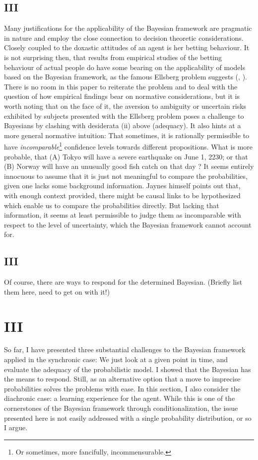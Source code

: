 \documentclass[11pt, a4paper]{scrartcl}
\begin{document}
\subsection{III}
Many justifications for the applicability of the Bayesian framework are pragmatic in nature and employ the close connection to decision theoretic considerations. Closely coupled to the doxastic attitudes of an agent is her betting behaviour. It is not surprising then, that results from empirical studies of the betting behaviour of actual people do have some bearing on the applicability of models based on the Bayesian framework, as the famous Ellsberg problem suggests (\cite{10.2307/1884324}, \cite{Camerer1992}). There is no room in this paper to reiterate the problem and to deal with the question of how empirical findings bear on normative considerations, but it is worth noting that on the face of it, the aversion to ambiguity or uncertain risks exhibited by subjects presented with the Ellsberg problem poses a challenge to Bayesians by clashing with desiderata (ii) above (adequacy). It also hints at a more general normative intuition: That sometimes, it is rationally permissible to have \emph{incomparable}\footnote{Or sometimes, more fancifully, incommensurable.} confidence levels towards different propositions. What is more probable, that (A) Tokyo will have a severe earthquake on June 1, 2230; or that (B) Norway will have an unusually good fish catch on that day \citep[p.658]{Jaynes2003-JAYPTT}? It seems entirely innocuous to assume that it is just not meaningful to compare the probabilities, given one lacks some background information. Jaynes himself points out that, with enough context provided, there might be causal links to be hypothesized which enable us to compare the probabilities directly. But lacking that information, it seems at least permissible to judge them as incomparable with respect to the level of uncertainty, which the Bayesian framework cannot account for. 
\subsection{III}

Of course, there are ways to respond for the determined Bayesian. (Briefly list them here, need to get on with it!) 
\section{III}

So far, I have presented three substantial challenges to the Bayesian framework applied in the synchronic case: We just look at a given point in time, and evaluate the adequacy of the probabilistic model. I showed that the Bayesian has the means to respond. Still, as an alternative option that a move to imprecise probabilities solves the problems with ease. In this section, I also consider the diachronic case: a learning experience for the agent. While this is one of the cornerstones of the Bayesian framework through conditionalization, the issue presented here is not easily addressed with a single probability distribution, or so I argue. 
\end{document}
